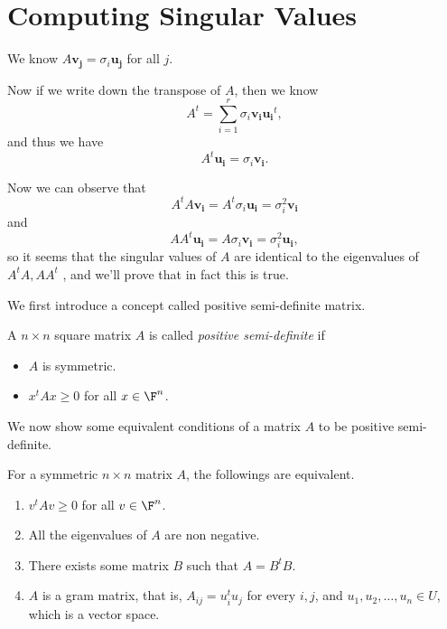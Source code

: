 \section{Computing Singular Values}
\begin{prev}
    We know \(A \mathbf{v_j} = \sigma _i \mathbf{u_j}  \) for all \(j\).  
\end{prev}

Now if we write down the transpose of \(A\), then we know 
\[
  A^t = \sum_{i=1}^{r} \sigma _i \mathbf{v_i} \mathbf{u_i}^t  , 
\]  
and thus we have  
\[
  A^t \mathbf{u_i} = \sigma _i \mathbf{v_i}.  
\]

Now we can observe that 
\[
  A^t A \mathbf{v_i} = A^t \sigma _i \mathbf{u_i} = \sigma _i^2 \mathbf{v_i}
\]
and 
\[
  A A^t \mathbf{u_i} = A \sigma _i \mathbf{v_i} = \sigma _i^2 \mathbf{u_i},  
\]
so it seems that the singular values of \(A\)  are identical to the eigenvalues of \(A^t A, A A^t\) , and we'll prove that in fact this is true. 

We first introduce a concept called positive semi-definite matrix. 

\begin{definition}
  A \(n \times n\)  square matrix \(A\) is called \textit{positive semi-definite} if 
  \begin{itemize}
    \item \(A\) is symmetric. 
    \item \(x^t A x \geq  0 \) for all \(x \in \F^n \).   
  \end{itemize}
\end{definition}

We now show some equivalent conditions of a matrix \(A\) to be positive semi-definite. 
\begin{lemma} \label{lm: positive semi-df}
  For a symmetric \(n \times n\) matrix \(A\), the followings are equivalent. 
  \begin{enumerate}
    \item \(v^t A v \geq 0\) for all \(v \in \F^n\). 
    \item All the eigenvalues of \(A\) are non negative. 
    \item There exists some matrix \(B\) such that \(A = B^t B\). 
    \item \(A\) is a gram matrix, that is, \(A_{ij} = u_i^t u_j\) for every \(i,j\), and \(u_1, u_2, \dots , u_n \in U \), which is a vector space.    
  \end{enumerate}  
\end{lemma}

